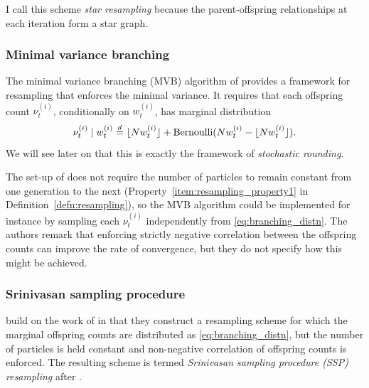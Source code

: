 I call this scheme \emph{star resampling} because the parent-offspring relationships at each iteration form a star graph.


\subsubsection{Minimal variance branching}
The minimal variance branching (MVB) algorithm of \textcite{crisan1999} provides a framework for resampling that enforces the minimal variance. 
It requires that each offspring count $\nu_t^{(i)}$, conditionally on $w_t^{(i)}$, has marginal distribution
\begin{equation}\label{eq:branching_distn}
\nu_t^{(i)} \mid w_t^{(i)} \overset{d}{=} \lfloor N w_t^{(i)} \rfloor + \operatorname{Bernoulli}(Nw_t^{(i)} - \lfloor N w_t^{(i)} \rfloor) .
\end{equation}
We will see later on that this is exactly the framework of \emph{stochastic rounding}.

The set-up of \textcite{crisan1999} does not require the number of particles to remain constant from one generation to the next (Property~\ref{item:resampling_property1} in Definition~\ref{defn:resampling}), so the MVB algorithm could be implemented for instance by sampling each $\nu_t^{(i)}$ independently from \eqref{eq:branching_distn}. The authors remark that enforcing strictly negative correlation between the offspring counts can improve the rate of convergence, but they do not specify how this might be achieved.


\subsubsection{Srinivasan sampling procedure}
\textcite{gerber2017} build on the work of \textcite{crisan1999} in that they construct a resampling scheme for which the marginal offspring counts are distributed as \eqref{eq:branching_distn}, but the number of particles is held constant and non-negative correlation of offspring counts is enforced. The resulting scheme is termed \emph{Srinivasan sampling procedure (SSP) resampling} after \textcite{srinivasan2001}.

